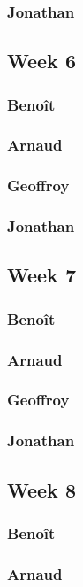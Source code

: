 \subsubsection*{Jonathan}

\subsection*{Week 6}
\subsubsection*{Benoît}
\subsubsection*{Arnaud}
\subsubsection*{Geoffroy}
\subsubsection*{Jonathan}

\subsection*{Week 7}
\subsubsection*{Benoît}
\subsubsection*{Arnaud}
\subsubsection*{Geoffroy}
\subsubsection*{Jonathan} 

\subsection*{Week 8}
\subsubsection*{Benoît}
\subsubsection*{Arnaud}
